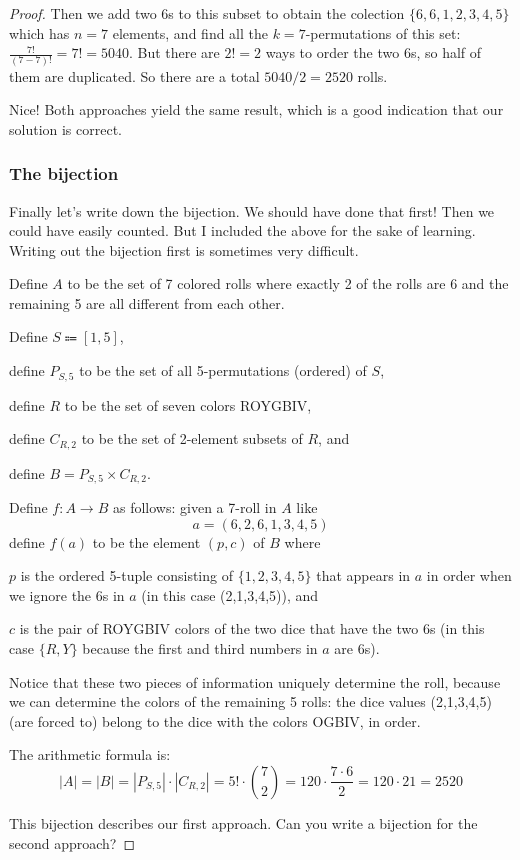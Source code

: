 \documentclass[14pt]{extarticle}
\begin{document}
\begin{proof}
Then we add two 6s to this subset to obtain the colection $\{6,6,1,2,3,4,5\}$ which has $n = 7$ elements, and find all the $k = 7$-permutations of this set: $\frac{7!}{(7-7)!} = 7! = 5040$. But there are $2! = 2$ ways to order the two 6s, so half of them are duplicated. So there are a total $5040/2 = 2520$ rolls.

Nice! Both approaches yield the same result, which is a good indication that our solution is correct.

\subsubsection{The bijection}

Finally let's write down the bijection. We should have done that first! Then we could have easily counted. But I included the above for the sake of learning. Writing out the bijection first is sometimes very difficult.

Define $A$ to be the set of 7 colored rolls where exactly 2 of the rolls are 6 and the remaining 5 are all different from each other. 

Define $S \Coloneqq [1,5]$, 

define $P_{S,5}$ to be the set of all 5-permutations (ordered) of $S$, 

define $R$ to be the set of seven colors ROYGBIV, 

define $C_{R, 2}$ to be the set of 2-element subsets of $R$, and 

define $B = P_{S,5} \times C_{R,2}$.

Define $f: A \to B$ as follows: given a 7-roll in $A$ like 
$$
a = (6, 2, 6, 1, 3, 4, 5)
$$
define $f(a)$ to be the element $(p, c)$ of $B$ where 

$p$ is the ordered 5-tuple consisting of $\{1,2,3,4,5\}$ that appears in $a$ in order when we ignore the 6s in $a$ (in this case (2,1,3,4,5)), and 

$c$ is the pair of ROYGBIV colors of the two dice that have the two 6s (in this case $\{R,Y\}$ because the first and third numbers in $a$ are 6s).

Notice that these two pieces of information uniquely determine the roll, because we can determine the colors of the remaining 5 rolls: the dice values (2,1,3,4,5) (are forced to) belong to the dice with the colors OGBIV, in order.

The arithmetic formula is:
$$
|A| = |B| = |P_{S,5}|\cdot|C_{R,2}| = 5! \cdot \binom{7}{2} = 120 \cdot \frac{7\cdot 6}{2} = 120 \cdot 21 = 2520
$$

This bijection describes our first approach. Can you write a bijection for the second approach?
\end{proof}
\end{document}
